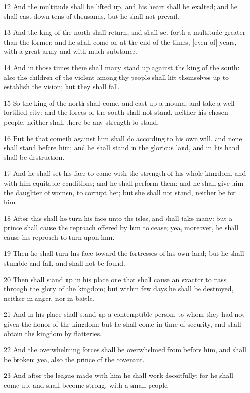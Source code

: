 \par 12 And the multitude shall be lifted up, and his heart shall be exalted; and he shall cast down tens of thousands, but he shall not prevail.
\par 13 And the king of the north shall return, and shall set forth a multitude greater than the former; and he shall come on at the end of the times, [even of] years, with a great army and with much substance.
\par 14 And in those times there shall many stand up against the king of the south: also the children of the violent among thy people shall lift themselves up to establish the vision; but they shall fall.
\par 15 So the king of the north shall come, and cast up a mound, and take a well-fortified city: and the forces of the south shall not stand, neither his chosen people, neither shall there be any strength to stand.
\par 16 But he that cometh against him shall do according to his own will, and none shall stand before him; and he shall stand in the glorious land, and in his hand shall be destruction.
\par 17 And he shall set his face to come with the strength of his whole kingdom, and with him equitable conditions; and he shall perform them: and he shall give him the daughter of women, to corrupt her; but she shall not stand, neither be for him.
\par 18 After this shall he turn his face unto the isles, and shall take many: but a prince shall cause the reproach offered by him to cease; yea, moreover, he shall cause his reproach to turn upon him.
\par 19 Then he shall turn his face toward the fortresses of his own land; but he shall stumble and fall, and shall not be found.
\par 20 Then shall stand up in his place one that shall cause an exactor to pass through the glory of the kingdom; but within few days he shall be destroyed, neither in anger, nor in battle.
\par 21 And in his place shall stand up a contemptible person, to whom they had not given the honor of the kingdom: but he shall come in time of security, and shall obtain the kingdom by flatteries.
\par 22 And the overwhelming forces shall be overwhelmed from before him, and shall be broken; yea, also the prince of the covenant.
\par 23 And after the league made with him he shall work deceitfully; for he shall come up, and shall become strong, with a small people.
